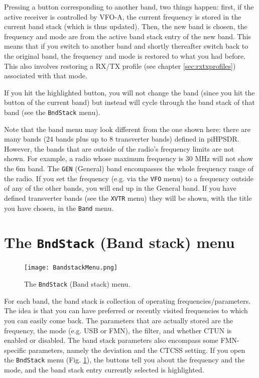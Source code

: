 \documentclass[12pt]{book}
\def\rett#1{\texttt{\color{red}#1}}
\def\bltt#1{\texttt{\color{blue}#1}}
\def\pH{pi\-HPSDR\xspace}
\begin{document}
Pressing a button corresponding to another band, two things happen: first, if the
active receiver is controlled by VFO-A, the current frequency is stored in the current
band stack (which is thus updated). Then, the new band is chosen, the frequency and mode
are from the active band stack entry of the new band. This means that if you switch
to another band and shortly thereafter switch back to the original band, the
frequency and mode is restored to what you had before. This also involves restoring
a RX/TX profile (see chapter \ref{sec:rxtxprofiles}) associated with that mode.

If you hit the highlighted button, you will not change the band (since you hit the
button of the current band) but instead will cycle through the band stack of that band
(see the \bltt{BndStack} menu).


Note that the band menu may look different from the one shown here: there are many bands
(24 bands plus up to 8 transverter bands) defined in \pH. However, the bands that
are outside of the radio's frequency limits are not shown. For example, a radio
whose maximum frequency is 30 MHz will not show the 6m band. The \rett{GEN} (General)
band encompasses the whole frequency range of the radio. If you set the frequency
(e.g. via the \bltt{VFO} menu) to a frequency outside of any of the other bands, you
will end up in the General band. If you have defined transverter bands (see the
\bltt{XVTR} menu) they will be shown, with the title you have chosen, in the
\bltt{Band} menu.

\section{The  \texttt{BndStack} (Band stack) menu}

\begin{figure}[ht!]
\center
\texttt{[image: BandstackMenu.png]}
\caption{The \bltt{BndStack} (Band stack) menu.}
\label{fig:BandstackMenu}
\end{figure}

For each band, the band stack is collection of operating frequencies/parameters. The idea is that
you can have preferred or recently visited frequencies to which you can easily come back.
The parameters that are actually stored are the frequency, the mode (e.g. USB or FMN),
the filter, and whether CTUN is enabled or disabled. The band stack parameters
also encompass some FMN-specific parameters,  namely the deviation and
the  CTCSS setting.
If you open the \bltt{BndStack} menu (Fig. \ref{fig:BandstackMenu}), the buttons
tell you about the frequency and the mode, and the band stack entry currently selected is highlighted.
\end{document}
